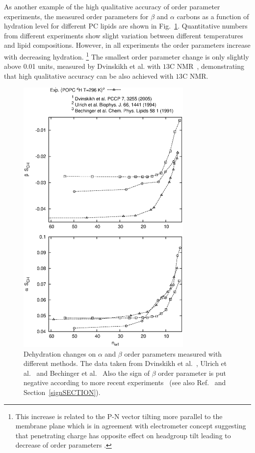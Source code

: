 \documentclass[aps,prl,superscriptaddress,twocolumn]{revtex4}
\begin{document}
As another example of the high qualitative accuracy of order parameter experiments, the measured order parameters
for $\beta$ and $\alpha$ carbons as a function of hydration level for different PC lipids are shown in 
Fig.~\ref{opDEHYDeffect}. Quantitative numbers from different experiments show slight variation between
different temperatures and lipid compositions. However, in all experiments the
order parameters increase with decreasing hydration.
\footnote{This increase is related to the P-N vector tilting more parallel to the membrane plane \cite{botan15}
which is in agreement with electrometer concept suggesting that penetrating charge has opposite 
effect on headgroup tilt leading to decrease of order parameters \cite{scherer89,ionpaper}.}
The smallest order parameter change is only slightly above 0.01 units, measured by Dvinskikh et al. 
with $ 13$C NMR~\cite{dvinskikh05b}, demonstrating that high qualitative accuracy can be
also achieved with $ 13$C NMR. 
\begin{figure}[]
  \includegraphics[width=8.6cm]{../Fig/OrderParameterDEHYDexp.eps}
\newline
  \caption{\label{opDEHYDeffect}
    Dehydration changes on $\alpha$ and $\beta$ order parameters measured with different methods. 
    The data taken from Dvinskikh et al.~\cite{dvinskikh05b}, Ulrich et al.~\cite{ulrich94} and Bechinger et al.~\cite{bechinger91}
    Also the sign of $\beta$ order parameter is put negative according
    to more recent experiments~\cite{hong95a,hong95b,gross97} (see also Ref.~\cite{botan15} and Section~\ref{signSECTION}).
  } 
\end{figure}
\end{document}
